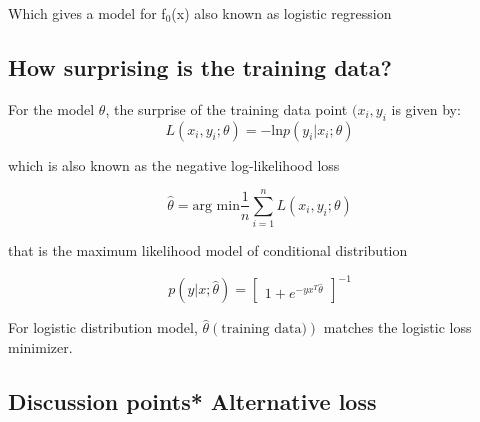 Which gives a model for f$_0$(x) also known as logistic regression

\subsection*{How surprising is the training data?}
For the model $\theta$, the surprise of the training data point $(x_i,y_i$ is given by:
\begin{equation}
L(x_i,y_i;\theta) = - \text{ln} p(y_i|x_i;\theta)
\end{equation}

which is also known as the negative log-likelihood loss

\begin{equation}
\hat{\theta} = \text{arg min} \frac{1} {n} \sum_{i=1}^{n} L(x_i,y_i;\theta)
\end{equation}

that is the maximum likelihood model of conditional distribution 

\begin{equation}
p(y|x;\hat{\theta}) = \begin{bmatrix} 1 + e^{-yx^{T}\hat{\theta}} \end{bmatrix}^{-1}
\end{equation}

For logistic distribution model, $\hat{\theta}(\text{training data)})$ matches the logistic loss minimizer. 

\subsection*{Discussion points* Alternative loss}

